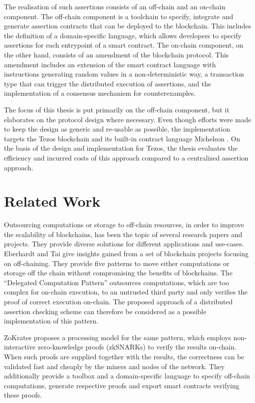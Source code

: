 The realisation of such assertions consists of an off-chain and an on-chain component. The off-chain component is a toolchain to specify, integrate and generate assertion contracts that can be deployed to the blockchain. This includes the definition of a domain-specific language, which allows developers to specify assertions for each entrypoint of a smart contract. The on-chain component, on the other hand, consists of an amendment of the blockchain protocol. This amendment includes an extension of the smart contract language with instructions generating random values in a non-deterministic way, a transaction type that can trigger the distributed execution of assertions, and the implementation of a consensus mechanism for counterexamples. 

The focus of this thesis is put primarily on the off-chain component, but it elaborates on the protocol design where necessary.  Even though efforts were made to keep the design as generic and re-usable as possible, the implementation targets the Tezos \cite{goodman_tezos_2014} blockchain and its built-in contract language Michelson \cite{michelson_ref}. On the basis of the design and implementation for Tezos, the thesis evaluates the efficiency and incurred costs of this approach compared to a centralized assertion approach.

\section{Related Work}
Outsourcing computations or storage to off-chain resources, in order to improve the scalability of blockchains, has been the topic of several research papers and projects. They provide diverse solutions for different applications and use-cases. Eberhardt and Tai \cite{eberhardt_offonchain} give insights gained from a set of blockchain projects focusing on off-chaining. They provide five patterns to move either computations or storage off the chain without compromising the benefits of blockchains. The ``Delegated Computation Pattern'' outsources computations, which are too complex for on-chain execution, to an untrusted third party and only verifies the proof of correct execution on-chain. The proposed approach of a distributed assertion checking scheme can therefore be considered as a possible implementation of this pattern.

ZoKrates \cite{eberhardt_zokrates_2018} proposes a processing model for the same pattern, which employs non-interactive zero-knowledge proofs (zkSNARKs) to verify the results on-chain. When such proofs are supplied together with the results, the correctness can be validated fast and cheaply by the miners and nodes of the network. They additionally provide a toolbox and a domain-specific language to specify off-chain computations, generate respective proofs and export smart contracts verifying these proofs.

